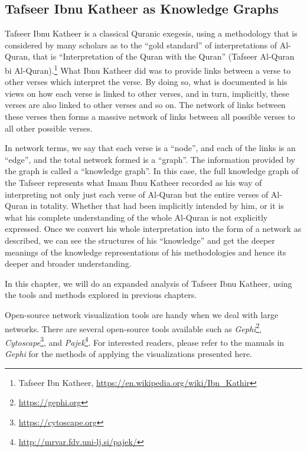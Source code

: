 \documentclass[
]{article}
\begin{document}
\hypertarget{tafseer-Ibnu-Katheer-as-knowledge-graphs}{%
\subsection{Tafseer Ibnu Katheer as Knowledge Graphs}\label{tafseer-Ibnu-Katheer-as-knowledge-graphs}}

Tafseer Ibnu Katheer is a classical Quranic exegesis, using a methodology that is considered by many scholars as to the ``gold standard'' of interpretations of Al-Quran, that is ``Interpretation of the Quran with the Quran'' (Tafseer Al-Quran bi Al-Quran).\footnote{Tafseer Ibn Katheer, \url{https://en.wikipedia.org/wiki/Ibn_Kathir}} What Ibnu Katheer did was to provide links between a verse to other verses which interpret the verse. By doing so, what is documented is his views on how each verse is linked to other verses, and in turn, implicitly, these verses are also linked to other verses and so on. The network of links between these verses then forms a massive network of links between all possible verses to all other possible verses.

In network terms, we say that each verse is a ``node'', and each of the links is an ``edge'', and the total network formed is a ``graph''. The information provided by the graph is called a ``knowledge graph''. In this case, the full knowledge graph of the Tafseer represents what Imam Ibnu Katheer recorded as his way of interpreting not only just each verse of Al-Quran but the entire verses of Al-Quran in totality. Whether that had been implicitly intended by him, or it is what his complete understanding of the whole Al-Quran is not explicitly expressed. Once we convert his whole interpretation into the form of a network as described, we can see the structures of his ``knowledge'' and get the deeper meanings of the knowledge representations of his methodologies and hence its deeper and broader understanding.

In this chapter, we will do an expanded analysis of Tafseer Ibnu Katheer, using the tools and methods explored in previous chapters.

Open-source network visualization tools are handy when we deal with large networks. There are several open-source tools available such as \emph{Gephi}\footnote{\url{https://gephi.org}}, \emph{Cytoscape}\footnote{\url{https://cytoscape.org}}, and \emph{Pajek}\footnote{\url{http://mrvar.fdv.uni-lj.si/pajek/}}. For interested readers, please refer to the manuals in \emph{Gephi} for the methods of applying the visualizations presented here.
\end{document}
